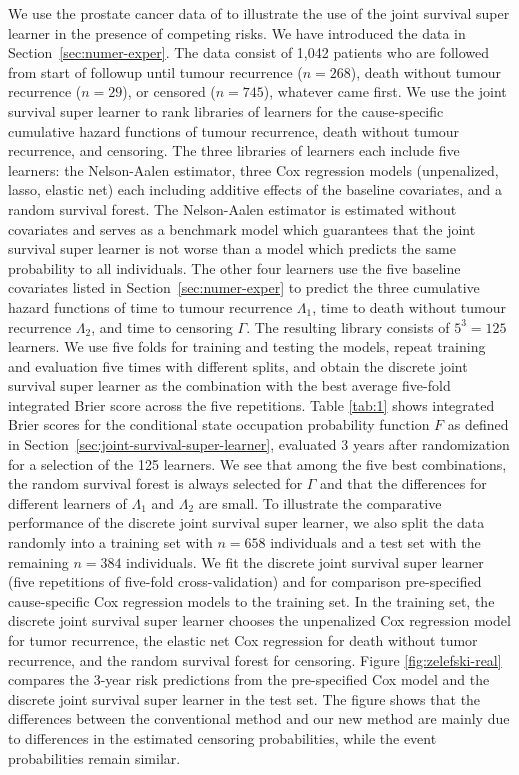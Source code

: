 \documentclass[alpha-refs]{wiley-article}
\newcommand{\1}{\mathbb{1}}
\begin{document}
We use the prostate cancer data of \cite{kattan2000pretreatment} to
illustrate the use of the joint survival super learner in the presence
of competing risks. We have introduced the data in
Section~\ref{sec:numer-exper}. The data consist of 1,042 patients who
are followed from start of followup until tumour recurrence ($n=268$),
death without tumour recurrence ($n=29$), or censored ($n=745$),
whatever came first. We use the joint survival super learner to rank
libraries of learners for the cause-specific cumulative hazard
functions of tumour recurrence, death without tumour recurrence, and
censoring. The three libraries of learners each include five learners:
the Nelson-Aalen estimator, three Cox regression models (unpenalized,
lasso, elastic net) each including additive effects of the baseline
covariates, and a random survival forest. The Nelson-Aalen estimator
is estimated without covariates and serves as a benchmark model which
guarantees that the joint survival super learner is not worse than a
model which predicts the same probability to all individuals. The
other four learners use the five baseline covariates listed in
Section~\ref{sec:numer-exper} to predict the three cumulative hazard
functions of time to tumour recurrence \( \Lambda_1 \), time to death
without tumour recurrence \( \Lambda_2 \), and time to censoring
$\Gamma$. The resulting library consists of \( 5^3 = 125 \)
learners. We use five folds for training and testing the models,
repeat training and evaluation five times with different splits, and
obtain the discrete joint survival super learner as the combination
with the best average five-fold integrated Brier score across the five
repetitions. Table \ref{tab:1} shows integrated Brier scores for the
conditional state occupation probability function \( F \) as defined
in Section~\ref{sec:joint-survival-super-learner}, evaluated 3 years
after randomization for a selection of the 125 learners. We see that
among the five best combinations, the random survival forest is always
selected for \(\Gamma\) and that the differences for different
learners of \(\Lambda_1\) and \(\Lambda_2\) are small. To illustrate
the comparative performance of the discrete joint survival super
learner, we also split the data randomly into a training set with
\(n=658\) individuals and a test set with the remaining \(n=384\)
individuals.  We fit the discrete joint survival super learner (five
repetitions of five-fold cross-validation) and for comparison
pre-specified cause-specific Cox regression models to the training
set. In the training set, the discrete joint survival super learner
chooses the unpenalized Cox regression model for tumor recurrence, the
elastic net Cox regression for death without tumor recurrence, and the
random survival forest for censoring. Figure \ref{fig:zelefski-real}
compares the 3-year risk predictions from the pre-specified Cox model
and the discrete joint survival super learner in the test set.
The figure shows that the differences between the conventional method
and our new method are mainly due to differences in the estimated
censoring probabilities, while the event probabilities remain similar.
\end{document}
